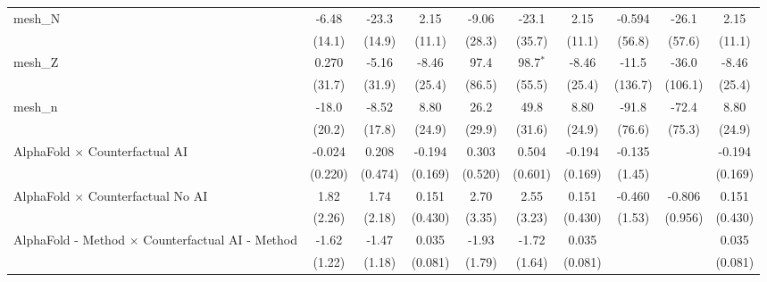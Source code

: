 \begin{tabular}{lccccccccc}
   mesh\_N                                                     & -6.48        & -23.3         & 2.15          & -9.06       & -23.1        & 2.15          & -0.594    & -26.1   & 2.15\\   
                                                               & (14.1)       & (14.9)        & (11.1)        & (28.3)      & (35.7)       & (11.1)        & (56.8)    & (57.6)  & (11.1)\\   
   mesh\_Z                                                     & 0.270        & -5.16         & -8.46         & 97.4        & 98.7$^{*}$   & -8.46         & -11.5     & -36.0   & -8.46\\   
                                                               & (31.7)       & (31.9)        & (25.4)        & (86.5)      & (55.5)       & (25.4)        & (136.7)   & (106.1) & (25.4)\\   
   mesh\_n                                                     & -18.0        & -8.52         & 8.80          & 26.2        & 49.8         & 8.80          & -91.8     & -72.4   & 8.80\\   
                                                               & (20.2)       & (17.8)        & (24.9)        & (29.9)      & (31.6)       & (24.9)        & (76.6)    & (75.3)  & (24.9)\\   
   AlphaFold $\times$ Counterfactual AI                        & -0.024       & 0.208         & -0.194        & 0.303       & 0.504        & -0.194        & -0.135    &         & -0.194\\   
                                                               & (0.220)      & (0.474)       & (0.169)       & (0.520)     & (0.601)      & (0.169)       & (1.45)    &         & (0.169)\\   
   AlphaFold $\times$ Counterfactual No AI                     & 1.82         & 1.74          & 0.151         & 2.70        & 2.55         & 0.151         & -0.460    & -0.806  & 0.151\\   
                                                               & (2.26)       & (2.18)        & (0.430)       & (3.35)      & (3.23)       & (0.430)       & (1.53)    & (0.956) & (0.430)\\   
   AlphaFold - Method $\times$ Counterfactual AI - Method      & -1.62        & -1.47         & 0.035         & -1.93       & -1.72        & 0.035         &           &         & 0.035\\   
                                                               & (1.22)       & (1.18)        & (0.081)       & (1.79)      & (1.64)       & (0.081)       &           &         & (0.081)\\   

\end{tabular}
